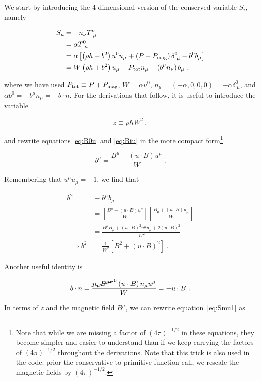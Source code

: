 \documentclass{article}
\newcommand{\bdotn}{b\cdot n}
\newcommand{\udotB}{u\cdot B}
\newcommand{\Ptot}{P_{\rm tot}}
\newcommand{\eq}[1]{
\begin{equation}
    #1
\end{equation}
}
\newcommand{\spl}[1]{
\eq{
\begin{split}
    #1
\end{split}
}
}
\begin{document}
We start by introducing the 4-dimensional version of the conserved variable $S_{i}$, namely

\spl{
S_{\mu} &= -n_{\nu}T^{\nu}_{\ \mu}\\
        &= \alpha T^{0}_{\ \mu}\\
        &= \alpha\left[\left(\rho h+b^{2}\right)u^{0}u_{\mu} + \left(P+P_{\rm mag}\right)\delta^{0}_{\ \mu} - b^{0}b_{\mu}\right]\\
        &= W\left(\rho h + b^{2}\right)u_{\mu} -\Ptot n_{\mu} + \left(b^{\nu}n_{\nu}\right)b_{\mu}\ ,\label{eq:Smu1}
}

\noindent where we have used $\Ptot \equiv P + P_{\rm mag}$, $W=\alpha u^{0}$, $n_{\mu} = \left(-\alpha,0,0,0\right)=-\alpha\delta^{0}_{\ \mu}$, and $\alpha b^{0} = -b^{\mu}n_{\mu}=-\bdotn$. For the derivations that follow, it is useful to introduce the variable

\eq{
z \equiv \rho h W^{2}\ ,
}

\noindent and rewrite equations \eqref{eq:B0u} and \eqref{eq:Biu} in the more compact form\footnote{Note that while we are missing a factor of $\left(4\pi\right)^{-1/2}$ in these equations, they become simpler and easier to understand than if we keep carrying the factors of $\left(4\pi\right)^{-1/2}$ throughout the derivations. Note that this trick is also used in the code: prior the conservative-to-primitive function call, we rescale the magnetic fields by $\left(4\pi\right)^{-1/2}$.}

\eq{
b^{\mu} = \frac{B^{\mu} + \left(\udotB\right)u^{\mu}}{W}\ .
}

\noindent Remembering that $u^{\mu}u_{\mu}=-1$, we find that

\spl{
b^{2} &\equiv b^{\mu}b_{\mu}\\
      &= \left[\frac{B^{\mu} + \left(\udotB\right)u^{\mu}}{W}\right]
         \left[\frac{B_{\mu} + \left(\udotB\right)u_{\mu}}{W}\right]\\
      &= \frac{B^{\mu}B_{\mu} + \left(\udotB\right)^{2}u^{\mu}u_{\mu} + 2\left(\udotB\right)^{2}}{W^{2}}\\
\implies b^{2}&= \frac{1}{W^{2}}\left[B^{2} + \left(\udotB\right)^{2}\right]\ .
}

\noindent Another useful identity is

\eq{
\bdotn = \frac{\cancelto{0}{n_{\mu}B^{\mu}} + \left(\udotB\right)n_{\mu}u^{\mu}}{W} = -\udotB\ .
}

\noindent In terms of $z$ and the magnetic field $B^{\mu}$, we can rewrite equation~\eqref{eq:Smu1} as
\end{document}
